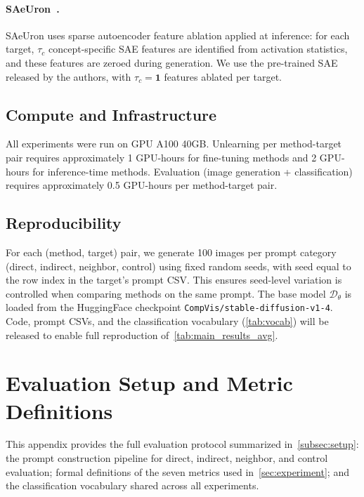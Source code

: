 \paragraph{SAeUron~\citep{cywinski2025saeuron}.} 
SAeUron uses sparse autoencoder feature ablation applied at inference: for each target, $\tau_c$ concept-specific SAE features are identified from activation statistics, and these features are zeroed during generation. We use the pre-trained SAE released by the authors, with 
$\tau_c = \textbf{1}$ features ablated per target. 


\subsection{Compute and Infrastructure}
All experiments were run on GPU A100 40GB. Unlearning per method-target pair requires approximately 1 GPU-hours for fine-tuning methods and 2 GPU-hours for inference-time methods. Evaluation (image generation + classification) requires approximately 0.5 GPU-hours per method-target pair.

\subsection{Reproducibility}
For each (method, target) pair, we generate 100 images per 
prompt category (direct, indirect, neighbor, control) using fixed random seeds, with seed equal to the row index in the target's prompt CSV. This ensures seed-level variation is controlled when comparing methods on the same prompt.
The base model $\mathcal{D}_\theta$ is loaded from the HuggingFace checkpoint \texttt{CompVis/stable-diffusion-v1-4}. Code, prompt CSVs, and the classification vocabulary (\cref{tab:vocab}) will be released to enable full reproduction of~\cref{tab:main_results_avg}.
\section{Evaluation Setup and Metric Definitions}
\label{app:evaluation_setup}
This appendix provides the full evaluation protocol summarized in~\cref{subsec:setup}: the prompt construction pipeline for direct, indirect, neighbor, and control evaluation; formal definitions of the seven metrics used in~\cref{sec:experiment}; and the classification vocabulary shared across all experiments.

